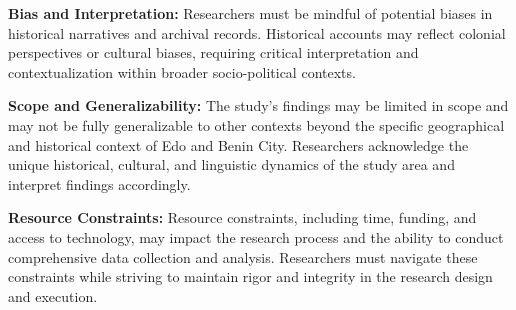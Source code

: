 \textbf{Bias and Interpretation:} Researchers must be mindful of potential biases in historical narratives and archival records. Historical accounts may reflect colonial perspectives or cultural biases, requiring critical interpretation and contextualization within broader socio-political contexts.

\textbf{Scope and Generalizability:} The study's findings may be limited in scope and may not be fully generalizable to other contexts beyond the specific geographical and historical context of Edo and Benin City. Researchers acknowledge the unique historical, cultural, and linguistic dynamics of the study area and interpret findings accordingly.

\textbf{Resource Constraints:} Resource constraints, including time, funding, and access to technology, may impact the research process and the ability to conduct comprehensive data collection and analysis. Researchers must navigate these constraints while striving to maintain rigor and integrity in the research design and execution.
